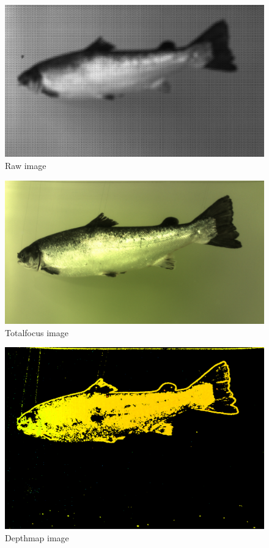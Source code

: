 \begin{figure}[h]
    \centering
    \includegraphics[width=.9\linewidth]{Images/raw}
    \caption{Raw image}
    \label{fig:raw_image}
\end{figure}

\begin{figure}[h]
    \centering
    \includegraphics[width=.9\linewidth]{Images/totalfocus}
    \caption{Totalfocus image}
    \label{fig:totalfocus}
\end{figure}

\begin{figure}[h]
    \centering
    \includegraphics[width=.9\linewidth]{Images/depthmap}
    \caption{Depthmap image}
    \label{fig:depthmap}
\end{figure}

